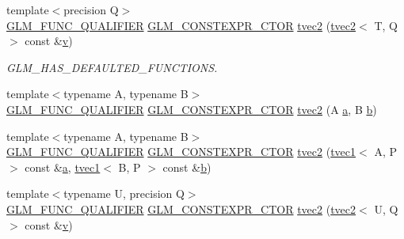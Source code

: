 \begin{DoxyCompactItemize}
\item 
{\footnotesize template$<$precision Q$>$ }\\\mbox{\hyperlink{setup_8hpp_a33fdea6f91c5f834105f7415e2a64407}{G\+L\+M\+\_\+\+F\+U\+N\+C\+\_\+\+Q\+U\+A\+L\+I\+F\+I\+ER}} \mbox{\hyperlink{setup_8hpp_ad34178a09666081abdb573c14d1f4a5a}{G\+L\+M\+\_\+\+C\+O\+N\+S\+T\+E\+X\+P\+R\+\_\+\+C\+T\+OR}} \mbox{\hyperlink{structglm_1_1tvec2_a47853ad220033f45cf430dc6b997ad93}{tvec2}} (\mbox{\hyperlink{structglm_1_1tvec2}{tvec2}}$<$ T, Q $>$ const \&\mbox{\hyperlink{glad_8h_a14cfbe2fc2234f5504618905b69d1e06}{v}})
\begin{DoxyCompactList}\small\item\em G\+L\+M\+\_\+\+H\+A\+S\+\_\+\+D\+E\+F\+A\+U\+L\+T\+E\+D\+\_\+\+F\+U\+N\+C\+T\+I\+O\+NS. \end{DoxyCompactList}\item 
{\footnotesize template$<$typename A, typename B$>$ }\\\mbox{\hyperlink{setup_8hpp_a33fdea6f91c5f834105f7415e2a64407}{G\+L\+M\+\_\+\+F\+U\+N\+C\+\_\+\+Q\+U\+A\+L\+I\+F\+I\+ER}} \mbox{\hyperlink{setup_8hpp_ad34178a09666081abdb573c14d1f4a5a}{G\+L\+M\+\_\+\+C\+O\+N\+S\+T\+E\+X\+P\+R\+\_\+\+C\+T\+OR}} \mbox{\hyperlink{structglm_1_1tvec2_a167151d2df6c270325b9dc98d0dbc0ba}{tvec2}} (A \mbox{\hyperlink{glad_8h_ac8729153468b5dcf13f971b21d84d4e5}{a}}, B \mbox{\hyperlink{glad_8h_a6eba317e3cf44d6d26c04a5a8f197dcb}{b}})
\item 
{\footnotesize template$<$typename A, typename B$>$ }\\\mbox{\hyperlink{setup_8hpp_a33fdea6f91c5f834105f7415e2a64407}{G\+L\+M\+\_\+\+F\+U\+N\+C\+\_\+\+Q\+U\+A\+L\+I\+F\+I\+ER}} \mbox{\hyperlink{setup_8hpp_ad34178a09666081abdb573c14d1f4a5a}{G\+L\+M\+\_\+\+C\+O\+N\+S\+T\+E\+X\+P\+R\+\_\+\+C\+T\+OR}} \mbox{\hyperlink{structglm_1_1tvec2_aed8786f52c21247f99eaa2f608ac092c}{tvec2}} (\mbox{\hyperlink{structglm_1_1tvec1}{tvec1}}$<$ A, P $>$ const \&\mbox{\hyperlink{glad_8h_ac8729153468b5dcf13f971b21d84d4e5}{a}}, \mbox{\hyperlink{structglm_1_1tvec1}{tvec1}}$<$ B, P $>$ const \&\mbox{\hyperlink{glad_8h_a6eba317e3cf44d6d26c04a5a8f197dcb}{b}})
\item 
{\footnotesize template$<$typename U, precision Q$>$ }\\\mbox{\hyperlink{setup_8hpp_a33fdea6f91c5f834105f7415e2a64407}{G\+L\+M\+\_\+\+F\+U\+N\+C\+\_\+\+Q\+U\+A\+L\+I\+F\+I\+ER}} \mbox{\hyperlink{setup_8hpp_ad34178a09666081abdb573c14d1f4a5a}{G\+L\+M\+\_\+\+C\+O\+N\+S\+T\+E\+X\+P\+R\+\_\+\+C\+T\+OR}} \mbox{\hyperlink{structglm_1_1tvec2_aa86f005e11de8a9134370f9d92fb096c}{tvec2}} (\mbox{\hyperlink{structglm_1_1tvec2}{tvec2}}$<$ U, Q $>$ const \&\mbox{\hyperlink{glad_8h_a14cfbe2fc2234f5504618905b69d1e06}{v}})

\end{DoxyCompactItemize}
